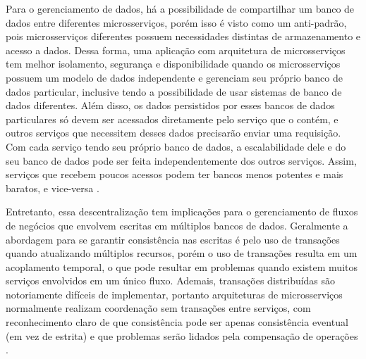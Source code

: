 Para o gerenciamento de dados, há a possibilidade de compartilhar um banco de dados entre diferentes microsserviços, porém isso é visto como um anti-padrão, pois microsserviços diferentes possuem necessidades distintas de armazenamento e acesso a dados. Dessa forma, uma aplicação com arquitetura de microsserviços tem melhor isolamento, segurança e disponibilidade quando os microsserviços possuem um modelo de dados independente e gerenciam seu próprio banco de dados particular, inclusive tendo a possibilidade de usar sistemas de banco de dados diferentes. Além disso, os dados persistidos por esses bancos de dados particulares só devem ser acessados diretamente pelo serviço que o contém, e outros serviços que necessitem desses dados precisarão enviar uma requisição. Com cada serviço tendo seu próprio banco de dados, a escalabilidade dele e do seu banco de dados pode ser feita independentemente dos outros serviços. Assim, serviços que recebem poucos acessos podem ter bancos menos potentes e mais baratos, e vice-versa \cite{oracle_microservices,martin-fowler-microservices}.

Entretanto, essa descentralização tem implicações para o gerenciamento de fluxos de negócios que envolvem escritas em múltiplos bancos de dados. Geralmente a abordagem para se garantir consistência nas escritas é pelo uso de transações quando atualizando múltiplos recursos, porém o uso de transações resulta em um acoplamento temporal, o que pode resultar em problemas quando existem muitos serviços envolvidos em um único fluxo. Ademais, transações distribuídas são notoriamente difíceis de implementar, portanto arquiteturas de microsserviços normalmente realizam coordenação sem transações entre serviços, com reconhecimento claro de que consistência pode ser apenas consistência eventual (em vez de estrita) e que problemas serão lidados pela compensação de operações \cite{martin-fowler-microservices}. 




